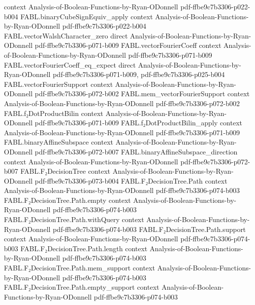 \begin{theorem}
  {context}
  {Analysis-of-Boolean-Functions-by-Ryan-ODonnell}
  {pdf-ffbe9c7b3306-p022-b004}
\proofstep
  {FABL.binaryCubeSignEquiv_apply}
  {context}
  {Analysis-of-Boolean-Functions-by-Ryan-ODonnell}
  {pdf-ffbe9c7b3306-p022-b004}
\proofstep
  {FABL.vectorWalshCharacter_zero}
  {direct}
  {Analysis-of-Boolean-Functions-by-Ryan-ODonnell}
  {pdf-ffbe9c7b3306-p071-b009}
\proofstep
  {FABL.vectorFourierCoeff}
  {context}
  {Analysis-of-Boolean-Functions-by-Ryan-ODonnell}
  {pdf-ffbe9c7b3306-p071-b009}
\proofstep
  {FABL.vectorFourierCoeff_eq_expect}
  {direct}
  {Analysis-of-Boolean-Functions-by-Ryan-ODonnell}
  {pdf-ffbe9c7b3306-p071-b009,
    pdf-ffbe9c7b3306-p025-b004}
\proofstep
  {FABL.vectorFourierSupport}
  {context}
  {Analysis-of-Boolean-Functions-by-Ryan-ODonnell}
  {pdf-ffbe9c7b3306-p072-b002}
\proofstep
  {FABL.mem_vectorFourierSupport}
  {context}
  {Analysis-of-Boolean-Functions-by-Ryan-ODonnell}
  {pdf-ffbe9c7b3306-p072-b002}
\proofstep
  {FABL.f₂DotProductBilin}
  {context}
  {Analysis-of-Boolean-Functions-by-Ryan-ODonnell}
  {pdf-ffbe9c7b3306-p071-b009}
\proofstep
  {FABL.f₂DotProductBilin_apply}
  {context}
  {Analysis-of-Boolean-Functions-by-Ryan-ODonnell}
  {pdf-ffbe9c7b3306-p071-b009}
\proofstep
  {FABL.binaryAffineSubspace}
  {context}
  {Analysis-of-Boolean-Functions-by-Ryan-ODonnell}
  {pdf-ffbe9c7b3306-p072-b007}
\proofstep
  {FABL.binaryAffineSubspace_direction}
  {context}
  {Analysis-of-Boolean-Functions-by-Ryan-ODonnell}
  {pdf-ffbe9c7b3306-p072-b007}
\proofstep
  {FABL.F₂DecisionTree}
  {context}
  {Analysis-of-Boolean-Functions-by-Ryan-ODonnell}
  {pdf-ffbe9c7b3306-p073-b004}
\proofstep
  {FABL.F₂DecisionTree.Path}
  {context}
  {Analysis-of-Boolean-Functions-by-Ryan-ODonnell}
  {pdf-ffbe9c7b3306-p074-b003}
\proofstep
  {FABL.F₂DecisionTree.Path.empty}
  {context}
  {Analysis-of-Boolean-Functions-by-Ryan-ODonnell}
  {pdf-ffbe9c7b3306-p074-b003}
\proofstep
  {FABL.F₂DecisionTree.Path.withQuery}
  {context}
  {Analysis-of-Boolean-Functions-by-Ryan-ODonnell}
  {pdf-ffbe9c7b3306-p074-b003}
\proofstep
  {FABL.F₂DecisionTree.Path.support}
  {context}
  {Analysis-of-Boolean-Functions-by-Ryan-ODonnell}
  {pdf-ffbe9c7b3306-p074-b003}
\proofstep
  {FABL.F₂DecisionTree.Path.length}
  {context}
  {Analysis-of-Boolean-Functions-by-Ryan-ODonnell}
  {pdf-ffbe9c7b3306-p074-b003}
\proofstep
  {FABL.F₂DecisionTree.Path.mem_support}
  {context}
  {Analysis-of-Boolean-Functions-by-Ryan-ODonnell}
  {pdf-ffbe9c7b3306-p074-b003}
\proofstep
  {FABL.F₂DecisionTree.Path.empty_support}
  {context}
  {Analysis-of-Boolean-Functions-by-Ryan-ODonnell}
  {pdf-ffbe9c7b3306-p074-b003}

\end{theorem}
